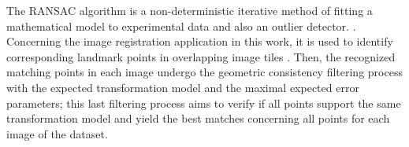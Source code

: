 The RANSAC algorithm is a non-deterministic iterative method of fitting a mathematical model to experimental data and also an outlier detector. \cite{fischler1981random}. Concerning the image registration application in this work, it is used to identify corresponding landmark points in overlapping image tiles \cite{saalfeld2019computational}. Then, the recognized matching points in each image undergo the geometric consistency filtering process with the expected transformation model and the maximal expected error parameters; this last filtering process aims to verify if all points support the same transformation model and yield the best matches concerning all points for each image of the dataset.
